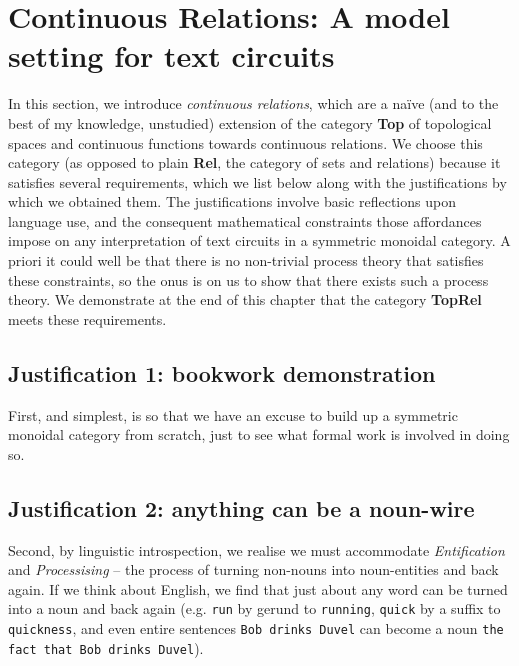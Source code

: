 \section{Continuous Relations: A model setting for text circuits}

\begin{fullwidth}

In this section, we introduce \emph{continuous relations}, which are a na\"{i}ve (and to the best of my knowledge, unstudied) extension of the category \textbf{Top} of topological spaces and continuous functions towards continuous relations. We choose this category (as opposed to plain \textbf{Rel}, the category of sets and relations) because it satisfies several requirements, which we list below along with the justifications by which we obtained them. The justifications involve basic reflections upon language use, and the consequent mathematical constraints those affordances impose on any interpretation of text circuits in a symmetric monoidal category. A priori it could well be that there is no non-trivial process theory that satisfies these constraints, so the onus is on us to show that there exists such a process theory. We demonstrate at the end of this chapter that the category \textbf{TopRel} meets these requirements.

\subsection{Justification 1: bookwork demonstration}

First, and simplest, is so that we have an excuse to build up a symmetric monoidal category from scratch, just to see what formal work is involved in doing so.\\

\subsection{Justification 2: anything can be a noun-wire}

Second, by linguistic introspection, we realise we must accommodate \emph{Entification} and \emph{Processising} -- the process of turning non-nouns into noun-entities and back again. If we think about English, we find that just about any word can be turned into a noun and back again (e.g. \texttt{run} by gerund to \texttt{running}, \texttt{quick} by a suffix to \texttt{quickness}, and even entire sentences \texttt{Bob drinks Duvel} can become a noun \texttt{the fact that Bob drinks Duvel}).\\


\end{fullwidth}
